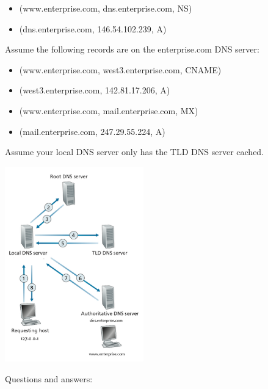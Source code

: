 \documentclass{article}
\begin{document}
\begin{itemize}
	\item (www.enterprise.com, dns.enterprise.com, NS)
	\item (dns.enterprise.com, 146.54.102.239, A)
\end{itemize}
Assume the following records are on the enterprise.com DNS server:

\begin{itemize}
	\item (www.enterprise.com, west3.enterprise.com, CNAME)
	\item (west3.enterprise.com, 142.81.17.206, A)
	\item (www.enterprise.com, mail.enterprise.com, MX)
	\item (mail.enterprise.com, 247.29.55.224, A)
\end{itemize}
Assume your local DNS server only has the TLD DNS server cached. \\

\centerline{\includegraphics[width=6cm]{assets/ex6}}
\noindent Questions and answers:
\end{document}
